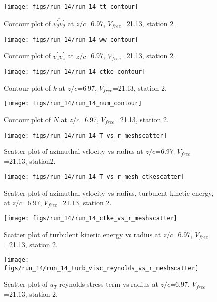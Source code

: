 \begin{figure}[H]
\centering
\texttt{[image: figs/run\_14/run\_14\_tt\_contour]}
\caption{Contour plot of $\overline{v_{\theta}^{\prime} v_{\theta}^{\prime}}$ at $z/c$=6.97, $V_{free}$=21.13, station 2.}
\end{figure}


\begin{figure}[H]
\centering
\texttt{[image: figs/run\_14/run\_14\_ww\_contour]}
\caption{Contour plot of $\overline{v_{z}^{\prime} v_{z}^{\prime}}$ at $z/c$=6.97, $V_{free}$=21.13, station 2.}
\end{figure}


\begin{figure}[H]
\centering
\texttt{[image: figs/run\_14/run\_14\_ctke\_contour]}
\caption{Contour plot of $k$ at $z/c$=6.97, $V_{free}$=21.13, station 2.}
\end{figure}


\begin{figure}[H]
\centering
\texttt{[image: figs/run\_14/run\_14\_num\_contour]}
\caption{Contour plot of $N$ at $z/c$=6.97, $V_{free}$=21.13, station 2.}
\end{figure}


\begin{figure}[H]
\centering
\texttt{[image: figs/run\_14/run\_14\_T\_vs\_r\_meshscatter]}
\caption{Scatter plot of azimuthal velocity vs radius at $z/c$=6.97, $V_{free}$=21.13, station2.}
\end{figure}


\begin{figure}[H]
\centering
\texttt{[image: figs/run\_14/run\_14\_T\_vs\_r\_mesh\_ctkescatter]}
\caption{Scatter plot of azimuthal velocity vs radius, turbulent kinetic energy, at $z/c$=6.97, $V_{free}$=21.13, station 2.}
\end{figure}


\begin{figure}[H]
\centering
\texttt{[image: figs/run\_14/run\_14\_ctke\_vs\_r\_meshscatter]}
\caption{Scatter plot of turbulent kinetic energy vs radius at $z/c$=6.97, $V_{free}$=21.13, station 2.}
\end{figure}


\begin{figure}[H]
\centering
\texttt{[image: figs/run\_14/run\_14\_turb\_visc\_reynolds\_vs\_r\_meshscatter]}
\caption{Scatter plot of $
u_T$ reynolds stress term vs radius at $z/c$=6.97, $V_{free}$=21.13, station 2.}
\end{figure}


